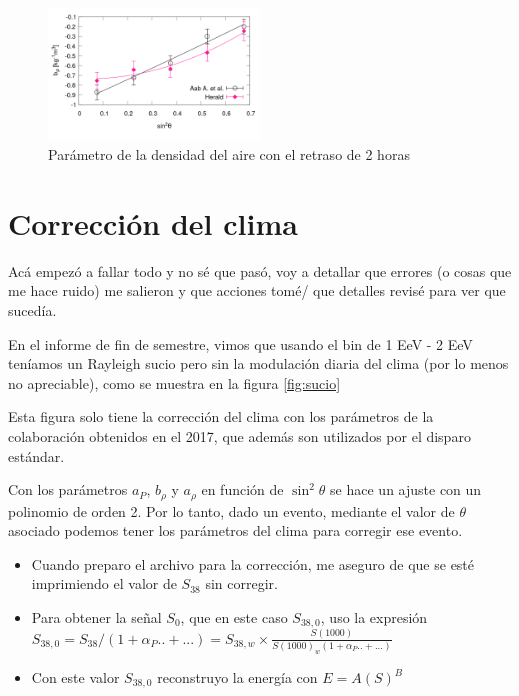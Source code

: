 \begin{figure}[H]
	\centering
	\includegraphics[width=0.5\textwidth]{figura_b_rho.png}
	\caption{Parámetro de la densidad del aire con el retraso de 2 horas}
	\label{fig:brho}
\end{figure}


\section{Corrección del clima}

Acá empezó a fallar todo y no sé que pasó, voy a detallar que errores (o cosas que me hace ruido) me salieron y que acciones tomé/ que detalles revisé para ver que sucedía.

En el informe de fin  de semestre, vimos que usando el bin  de 1 EeV - 2 EeV teníamos un Rayleigh sucio pero sin  la modulación diaria del clima (por lo menos no apreciable), como se muestra en la figura \ref{fig:sucio}



Esta figura solo tiene la corrección del clima con los parámetros de la colaboración obtenidos en el 2017, que además son utilizados por el disparo estándar.

Con los parámetros $a_P$, $b_\rho$ y $a_\rho$ en función de $\sin^2 \theta$ se hace un ajuste con un polinomio de orden 2. Por lo tanto, dado un evento, mediante el  valor de $\theta$ asociado podemos tener los parámetros del clima para corregir ese evento.



\begin{itemize}
\item Cuando preparo el archivo para la corrección, me aseguro de que se esté imprimiendo el valor de $S_{38}$ sin corregir.

\item Para obtener la señal $S_0$, que en este caso $S_{38,0}$, uso la expresión $S_{38,0} = S_{38}/(1 + \alpha_P..+ ...) = S_{38,w}\times \frac{S(1000)}{S(1000)_w (1 + \alpha_P..+ ...)  }$  

\item Con este valor $S_{38,0}$ reconstruyo la energía con $E=A (S)^B$

\end{itemize}



